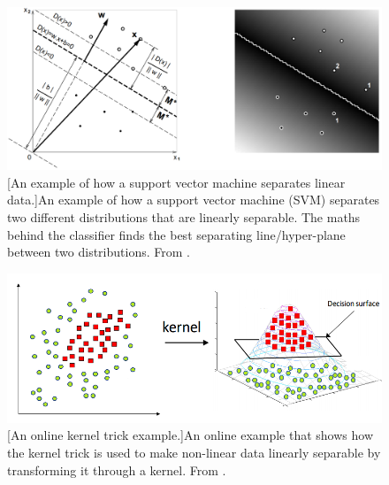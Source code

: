 \begin{figure}[!h]
\centering
\includegraphics[width=0.9\linewidth]{Chapter4/Figs/Raster/svmLinAndRbf/svmBoser92LinearSVM.png}
[An example of how a support vector machine separates linear data.]{An example of how a support vector machine (SVM) separates two different distributions that are linearly separable. The maths behind the classifier finds the best separating line/hyper-plane between two distributions. From \cite{Boser92atraining}.} 
\label{fig:svmBoser92LinearSVM}
\end{figure}


\begin{figure}[!h]
\centering
\includegraphics[width=0.9\linewidth]{Chapter4/Figs/Raster/svmLinAndRbf/kernelRBF_fromWeB.png}
[An online kernel trick example.]{An online example that shows how the kernel trick is used to make non-linear data linearly separable by transforming it through a kernel. From \cite{kernelTrickWeb}.} 
\label{fig:kernelRBF_fromWeB}
\end{figure}
 
